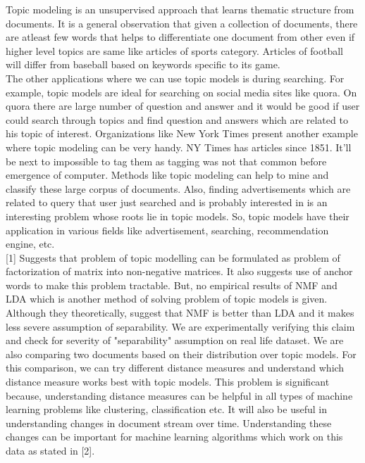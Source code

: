 \documentclass[a4paper,11pt]{article}
\begin{document}
Topic modeling is an unsupervised approach that learns thematic structure from documents. It is a general observation that given a collection of documents, there are atleast few words that helps to differentiate one document from other even if higher level topics are same like articles of sports category. Articles of football will differ from baseball based on keywords specific to its game. \\

The other applications where we can use topic models is during searching. For example, topic models are ideal for searching on social media sites like quora. On quora there are large number of question and answer and it would be good if user could search through topics and find question and answers which are related to his topic of interest. Organizations like New York Times present another example where topic modeling can be very handy. NY Times has articles since 1851. It’ll be next to impossible to tag them as tagging was not that common before emergence of computer. Methods like topic modeling can help to mine and classify these large corpus of documents. Also, finding advertisements which are related to query that user just searched and is probably interested in is an interesting problem whose roots lie in topic models. So, topic models have their application in various fields like advertisement, searching, recommendation engine, etc. \\

[1] Suggests that problem of topic modelling can be formulated as problem of factorization of matrix into non-negative matrices. It also suggests use of anchor words to make this problem tractable. But, no empirical results of NMF and LDA which is another method of solving problem of topic models is given. Although they theoretically, suggest that NMF is better than LDA and it makes less severe assumption of separability. We are experimentally verifying this claim and check for severity of "separability" assumption on real life dataset. We are also comparing two documents based on their distribution over topic models. For this comparison, we can try different distance measures and understand which distance measure works best with topic models. This problem is significant because, understanding distance measures can be helpful in all types of machine learning problems like clustering, classification etc. It will also be useful in understanding changes in document stream over time. Understanding these changes can be important for machine learning algorithms which work on this data as stated in [2]. \\
\end{document}
